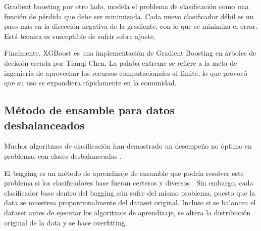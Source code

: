 Gradient boosting por otro lado, modela el problema de clasificación como una función de pérdida que debe ser minimizada. Cada nuevo clasificador débil es un paso más en la dirección negativa de la gradiente, con lo que se minimiza el error. Está tecnica es susceptible de sufrir sobre ajuste.

Finalmente, XGBoost es una implementación de Gradient Boosting en árboles de decisión creada por Tianqi Chen. La palaba extreme se refiere a la meta de ingeniería de aprovechar los recursos computacionales al límite, lo que provocó que su uso se expandiera rápidamente en la comunidad.



\subsection{Método de ensamble para datos desbalanceados}


Muchos algoritmos de clasificación han demostrado un desempeño no óptimo en problemas con clases desbalanceadas \cite{batista2004study, mani2003knn, seiffert2010rusboost}.

El bagging es un método de aprendizaje de ensamble que podría resolver este problema si los clasificadores base fueran certeros y diversos \cite{breiman1996bagging}. Sin embargo, cada clasificador base dentro del bagging aún sufre del mismo problema, puesto que la data se muestrea proporcionalmente del dataset original. Incluso si se balancea el dataset antes de ejecutar los algoritmos de aprendizaje, se altera la distribución original de la data y se hace overfitting.

